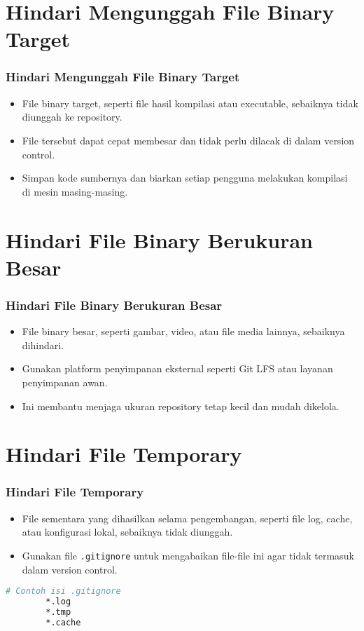 \documentclass[aspectratio=169, table]{beamer}
\begin{document}
\section{Hindari Mengunggah File Binary Target}
\begin{frame}[fragile]
	\frametitle{Hindari Mengunggah File Binary Target}
	\begin{itemize}
		\item File binary target, seperti file hasil kompilasi atau executable, sebaiknya tidak diunggah ke repository.
		\item File tersebut dapat cepat membesar dan tidak perlu dilacak di dalam version control.
		\item Simpan kode sumbernya dan biarkan setiap pengguna melakukan kompilasi di mesin masing-masing.
	\end{itemize}
\end{frame}

\section{Hindari File Binary Berukuran Besar}
\begin{frame}[fragile]
	\frametitle{Hindari File Binary Berukuran Besar}
	\begin{itemize}
		\item File binary besar, seperti gambar, video, atau file media lainnya, sebaiknya dihindari.
		\item Gunakan platform penyimpanan eksternal seperti Git LFS atau layanan penyimpanan awan.
		\item Ini membantu menjaga ukuran repository tetap kecil dan mudah dikelola.
	\end{itemize}
\end{frame}

\section{Hindari File Temporary}
\begin{frame}[fragile]
	\frametitle{Hindari File Temporary}
	\begin{itemize}
		\item File sementara yang dihasilkan selama pengembangan, seperti file log, cache, atau konfigurasi lokal, sebaiknya tidak diunggah.
		\item Gunakan file \texttt{.gitignore} untuk mengabaikan file-file ini agar tidak termasuk dalam version control.
	\end{itemize}
	\begin{lstlisting}[language=bash]
		# Contoh isi .gitignore
		*.log
		*.tmp
		*.cache
	\end{lstlisting}
\end{frame}
\end{document}
